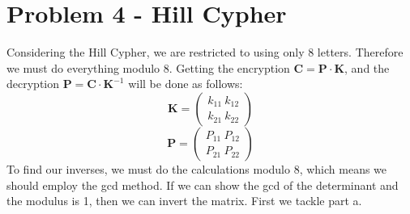 \documentclass[11pt]{article}
\begin{document}
\section{Problem 4 - Hill Cypher}
\label{sec:org685340e}
Considering the Hill Cypher, we are restricted to using only 8 letters. Therefore we must do everything modulo 8. Getting the encryption \(\mathbf{C} = \mathbf{P}\cdot \mathbf{K}\), and the decryption \(\mathbf{P} = \mathbf{C}\cdot \mathbf{K}^{-1}\)  will be done as follows:
\[
\mathbf{K} = \left(
\begin{matrix}
k_{11}\ k_{12} \\
k_{21}\ k_{22}
\end{matrix}
\right)
\]
\[
\mathbf{P} = \left(
\begin{matrix}
P_{11}\ P_{12} \\
P_{21}\ P_{22}
\end{matrix}
\right)
\]
To find our inverses, we must do the calculations modulo 8, which means we should employ the gcd method. If we can show the gcd of the determinant and the modulus is 1, then we can invert the matrix. First we tackle part a.
\end{document}
